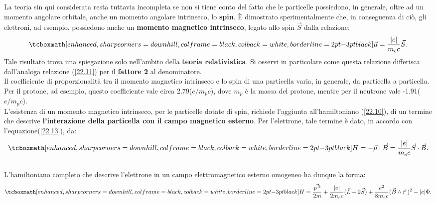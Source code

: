 La teoria sin qui considerata resta tuttavia incompleta se non si tiene conto del fatto che le particelle possiedono, in generale, oltre ad un momento angolare orbitale, anche un momento angolare intrinseco, lo \textbf{spin}. È dimostrato sperimentalmente che, in conseguenza di ciò, gli elettroni, ad esempio, possiedono anche un \textbf{momento magnetico intrinseco}, legato allo spin $\vec{S}$ dalla relazione:
	\begin{equation}
		\tcboxmath[enhanced, sharp corners=downhill, colframe=black, colback=white, borderline={2pt}{-3pt}{black}]{
			\vec{\mu}=\frac{|e|}{m_{e}c}\vec{S} .
			}
	\label{22.13}
	\end{equation}
Tale risultato trova una spiegazione solo nell'ambito della \textbf{teoria relativistica}. Si osservi in particolare come questa relazione differisca dall'analoga relazione (\ref{22.11}) per il \textbf{fattore 2} al denominatore.\\

Il coefficiente di proporzionalità tra il momento magnetico intrinseco e lo spin di una particella varia, in generale, da particella a particella. Per il protone, ad esempio, questo coefficiente vale circa 2.79($e/m_{p}c$), dove $m_{p}$ è la massa del protone, mentre per il neutrone vale -1.91($e/m_{p}c$).\\

L'esistenza di un momento magnetico intrinseco, per le particelle dotate di spin, richiede l'aggiunta all'hamiltoniano (\ref{22.10}), di un termine che descrive \textbf{l'interazione della particella con il campo magnetico esterno}. Per l'elettrone, tale termine è dato, in accordo con l'equazione(\ref{22.13}), da:
	\begin{equation}
		\tcboxmath[enhanced, sharp corners=downhill, colframe=black, colback=white, borderline={2pt}{-3pt}{black}]{
			H=-\vec{\mu}\cdot\vec{B}=\frac{|e|}{m_{e}c}\vec{S}\cdot\vec{B} .
			}
	\end{equation}\\
	
L'hamiltoniano completo che descrive l'elettrone in un campo elettromagnetico esterno omogeneo ha dunque la forma:
	\begin{equation}
		\tcboxmath[enhanced, sharp corners=downhill, colframe=black, colback=white, borderline={2pt}{-3pt}{black}]{
			H=\frac{\vec{p^{\;2}}}{2m}+\frac{|e|}{2m_{e}c}(\vec{L}+2\vec{S})+\frac{e^{2}}{8m_{e}c}(\vec{B}\wedge\vec{r}\;)^{2}-|e|\Phi .
			}
	\end{equation}
